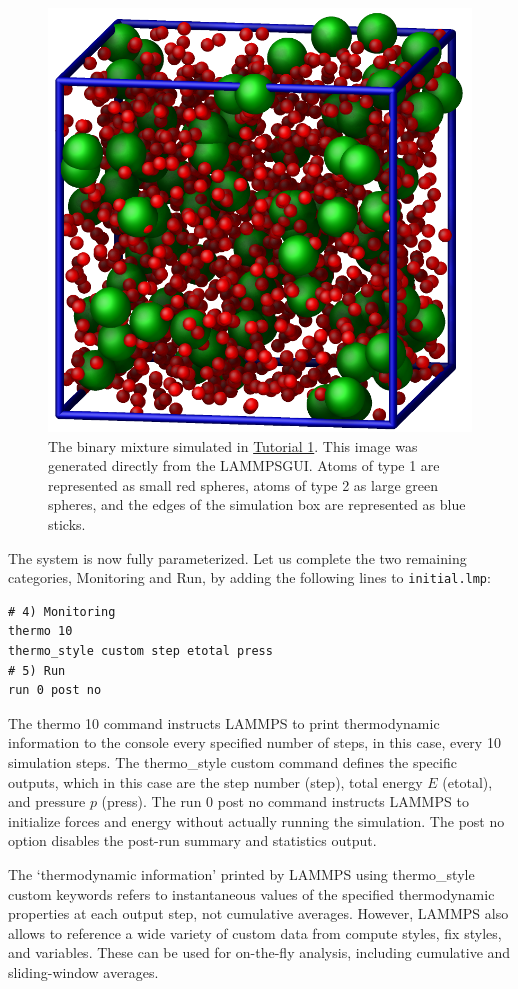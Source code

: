 \documentclass[9pt,tutorial]{livecoms}
\newcommand{\lmpcmd}[1]{\colorbox{listing}{\textcolor{command}{\small{#1}}}} %
\newcommand{\flecmd}[1]{\textcolor{command}{\texttt{#1}}} %
\newcommand{\lammpsgui}{\textsf{LAMMPS\textendash GUI}}
\begin{document}
\begin{figure}
\centering
\includegraphics[width=0.55\linewidth]{LJ}
\caption{The binary mixture simulated in \hyperref[lennard-jones-label]{Tutorial 1}.
  This image was generated directly from the \lammpsgui{}.  Atoms of
  type 1 are represented as small red spheres, atoms of type 2 as large
  green spheres, and the edges of the simulation box are represented as blue sticks.}
\label{fig:LJ}
\end{figure}

The system is now fully parameterized.  Let us complete the two remaining categories,
\lmpcmd{Monitoring} and \lmpcmd{Run}, by adding the following lines
to \flecmd{initial.lmp}:
\begin{lstlisting}
# 4) Monitoring
thermo 10
thermo_style custom step etotal press
# 5) Run
run 0 post no
\end{lstlisting}
The \lmpcmd{thermo 10} command instructs LAMMPS to print thermodynamic
information to the console every specified number of steps, in this case,
every 10 simulation steps.  The \lmpcmd{thermo\_style custom} command
defines the specific outputs, which in this case are the step number
(\lmpcmd{step}), total energy $E$ (\lmpcmd{etotal}), and pressure $p$ (\lmpcmd{press}).
The \lmpcmd{run 0 post no} command instructs LAMMPS to initialize forces and energy
without actually running the simulation.  The \lmpcmd{post no} option disables
the post-run summary and statistics output.

\begin{note}
  The `thermodynamic information' printed by
  LAMMPS using \lmpcmd{thermo\_style custom} keywords refers to
  instantaneous values of the specified thermodynamic properties
  at each output step, not cumulative averages.  However, LAMMPS also
  allows to reference a wide variety of custom data from compute styles, fix
  styles, and variables.  These can be used for on-the-fly analysis,
  including cumulative and sliding-window averages.
\end{note}
\end{document}
